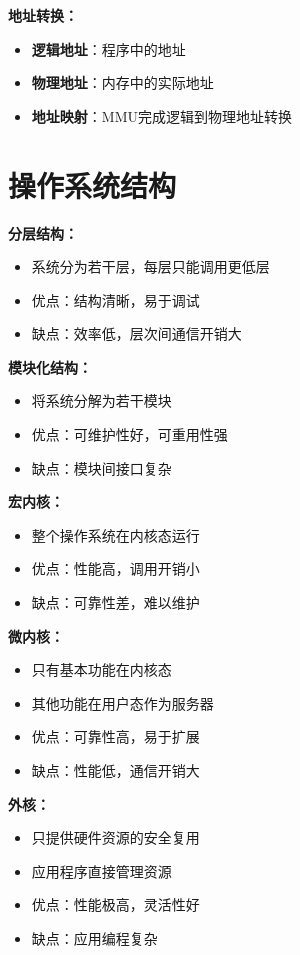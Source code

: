 \documentclass[lang=cn,newtx,10pt,scheme=chinese]{../../elegantbook}
\begin{document}
\textbf{地址转换：}
\begin{itemize}
  \item \textbf{逻辑地址}：程序中的地址
  \item \textbf{物理地址}：内存中的实际地址
  \item \textbf{地址映射}：MMU完成逻辑到物理地址转换
\end{itemize}

\section{操作系统结构}

\textbf{分层结构：}
\begin{itemize}
  \item 系统分为若干层，每层只能调用更低层
  \item 优点：结构清晰，易于调试
  \item 缺点：效率低，层次间通信开销大
\end{itemize}

\textbf{模块化结构：}
\begin{itemize}
  \item 将系统分解为若干模块
  \item 优点：可维护性好，可重用性强
  \item 缺点：模块间接口复杂
\end{itemize}

\textbf{宏内核：}
\begin{itemize}
  \item 整个操作系统在内核态运行
  \item 优点：性能高，调用开销小
  \item 缺点：可靠性差，难以维护
\end{itemize}

\textbf{微内核：}
\begin{itemize}
  \item 只有基本功能在内核态
  \item 其他功能在用户态作为服务器
  \item 优点：可靠性高，易于扩展
  \item 缺点：性能低，通信开销大
\end{itemize}

\textbf{外核：}
\begin{itemize}
  \item 只提供硬件资源的安全复用
  \item 应用程序直接管理资源
  \item 优点：性能极高，灵活性好
  \item 缺点：应用编程复杂
\end{itemize}
\end{document}
